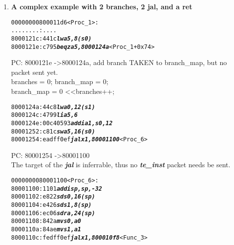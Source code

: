 \begin{enumerate}
\item

   \textbf{A complex example with 2 branches, 2 jal, and a ret}

  \begin {alltt}
00000000800011d6 <Proc\_1>:
    ........:   ....
    8000121c:	441c                	\textbf{\textit{lw	a5,8(s0)}}
    8000121e:	c795                	\textbf{\textit{beqz	a5,8000124a}} <Proc\_1+0x74>
  \end{alltt}
  
  \begin{frame}

  PC: 8000121e -\textgreater 8000124a, add branch TAKEN to branch\_map, but no packet sent yet.\\
  branches = 0; branch\_map = 0;\\
  branch\_map \textbar= 0 \textless\textless branches++;
  \end{frame}
  
\begin{alltt}
    
    8000124a:	44c8                	\textbf{\textit{lw	a0,12(s1)}}
    8000124c:	4799                	\textbf{\textit{li	a5,6}}
    8000124e:	00c40593          	\textbf{\textit{addi	a1,s0,12}}
    80001252:	c81c                	\textbf{\textit{sw	a5,16(s0)}}
    80001254:	eadff0ef          	\textbf{\textit{jal	x1,80001100}} <Proc\_6>
\end{alltt}

  \begin{frame}

  PC: 80001254 -\textgreater 80001100\\
  The target of the \textbf{\textit{jal}} is inferrable, thus no \textbf{\textit{te\_inst}} packet needs be sent.\\
  \end{frame}
  

\begin{alltt}
  
    0000000080001100 <Proc\_6>:
    80001100:	1101                    \textbf{\textit{addi	sp,sp,-32}}
    80001102:	e822                    \textbf{\textit{sd	s0,16(sp)}}
    80001104:	e426                    \textbf{\textit{sd	s1,8(sp)}}
    80001106:	ec06                    \textbf{\textit{sd	ra,24(sp)}}
    80001108:	842a                    \textbf{\textit{mv	s0,a0}}
    8000110a:	84ae                    \textbf{\textit{mv	s1,a1}}
    8000110c:	fedff0ef                \textbf{\textit{jal	x1,800010f8}} <Func\_3>
\end{alltt}


\end{enumerate}
